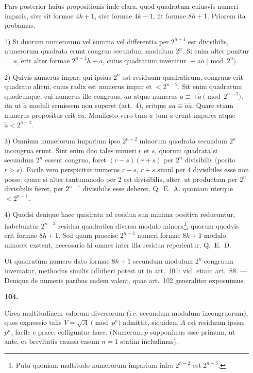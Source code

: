 \documentclass[12pt,a4paper]{article}
\theoremstyle{plain}
\theoremstyle{definition}
\theoremstyle{remark}
\begin{document}
Pars posterior huius propositionis inde clara, quod quadratum cuiusvis numeri imparis, sive sit formae $4k+1$, sive formae $4k-1$, fit formae $8h+1$. Priorem ita probamus.

1) Si duorum numerorum vel summa vel differentia per $2^{n-1}$ est divisibilis, numerorum quadrata erunt congrua secundum modulum $2^n$. Si enim alter ponitur $=a$, erit alter formae $2^{n-1}h + a$, cuius quadratum invenitur $\equiv aa \pmod{2^n}$.

2) Quivis numerus impar, qui ipsius $2^n$ est residuum quadraticum, congruus erit quadrato alicui, cuius radix est numerus impar et $<2^{n-2}$. Sit enim quadratum quodcunque, cui numerus ille congruus, $aa$ atque numerus $a \equiv \pm\tilde{a} \pmod{2^{n-2}}$, ita ut $\tilde{a}$ moduli semissem non superet (art.~4), eritque $aa \equiv \tilde{a}\tilde{a}$. Quare etiam numerus propositus erit $\tilde{a}\tilde{a}$. Manifesto vero tum $a$ tum $\tilde{a}$ erunt impares atque $\tilde{a}<2^{n-2}$.

3) Omnium numerorum imparium ipso $2^{n-2}$ minorum quadrata secundum $2^n$ incongrua erunt. Sint enim duo tales numeri $r$ et $s$, quorum quadrata si secundum $2^n$ essent congrua, foret $(r-s)(r+s)$ per $2^n$ divisibilis (posito $r>s$). Facile vero perspicitur numeros $r-s$, $r+s$ simul per $4$ divisibiles esse non posse, quare si alter tantummodo per $2$ est divisibilis, alter, ut productum per $2^n$ divisibilis fieret, per $2^{n-1}$ divisibilis esse deberet, Q.~E.~A. quoniam uterque $<2^{n-1}$.

4) Quodsi denique haec quadrata ad residua sua minima positiva reducuntur, habebuntur $2^{n-3}$ residua quadratica diversa modulo minora\footnote{Puta quoniam multitudo numerorum imparium infra $2^{n-2}$ est $2^{n-3}$.}, quorum quodvis erit formae $8h+1$. Sed quum praecise $2^{n-3}$ numeri formae $8h+1$ modulo minores exstent, necessario hi omnes inter illa residua reperientur. Q.~E.~D.

Ut quadratum numero dato formae $8h+1$ secundum modulum $2^n$ congruum inveniatur, methodus similis adhiberi potest ut in art.~101: vid. etiam art.~88. --- Denique de numeris paribus eadem valent, quae art.~102 generaliter exposuimus.

\setcounter{satz}{104}
\addtocounter{satz}{-1}
\textbf{104.}

Circa multitudinem valorum diversorum (i.e. secundum modulum incongruorum), quos expressio talis $V = \sqrt{A} \pmod{p^n}$ admittit, siquidem $A$ est residuum ipsius $p^n$, facile e praec. colliguntur haec. (Numerum $p$ supponimus esse primum, ut ante, et brevitatis caussa casum $n=1$ statim includimus).
\end{document}
